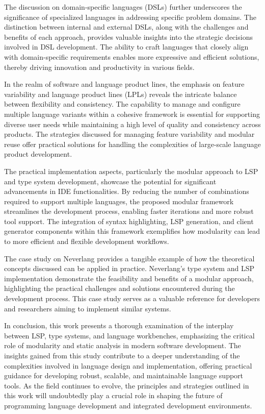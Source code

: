 The discussion on domain-specific languages (DSLs) further underscores the significance of specialized languages in addressing specific problem domains. The distinction between internal and external DSLs, along with the challenges and benefits of each approach, provides valuable insights into the strategic decisions involved in DSL development. The ability to craft languages that closely align with domain-specific requirements enables more expressive and efficient solutions, thereby driving innovation and productivity in various fields.

In the realm of software and language product lines, the emphasis on feature variability and language product lines (LPLs) reveals the intricate balance between flexibility and consistency. The capability to manage and configure multiple language variants within a cohesive framework is essential for supporting diverse user needs while maintaining a high level of quality and consistency across products. The strategies discussed for managing feature variability and modular reuse offer practical solutions for handling the complexities of large-scale language product development.

The practical implementation aspects, particularly the modular approach to LSP and type system development, showcase the potential for significant advancements in IDE functionalities. By reducing the number of combinations required to support multiple languages, the proposed modular framework streamlines the development process, enabling faster iterations and more robust tool support. The integration of syntax highlighting, LSP generation, and client generator components within this framework exemplifies how modularity can lead to more efficient and flexible development workflows.

The case study on Neverlang provides a tangible example of how the theoretical concepts discussed can be applied in practice. Neverlang's type system and LSP implementation demonstrate the feasibility and benefits of a modular approach, highlighting the practical challenges and solutions encountered during the development process. This case study serves as a valuable reference for developers and researchers aiming to implement similar systems.

In conclusion, this work presents a thorough examination of the interplay between LSP, type systems, and language workbenches, emphasizing the critical role of modularity and static analysis in modern software development. The insights gained from this study contribute to a deeper understanding of the complexities involved in language design and implementation, offering practical guidance for developing robust, scalable, and maintainable language support tools. As the field continues to evolve, the principles and strategies outlined in this work will undoubtedly play a crucial role in shaping the future of programming language development and integrated development environments.
